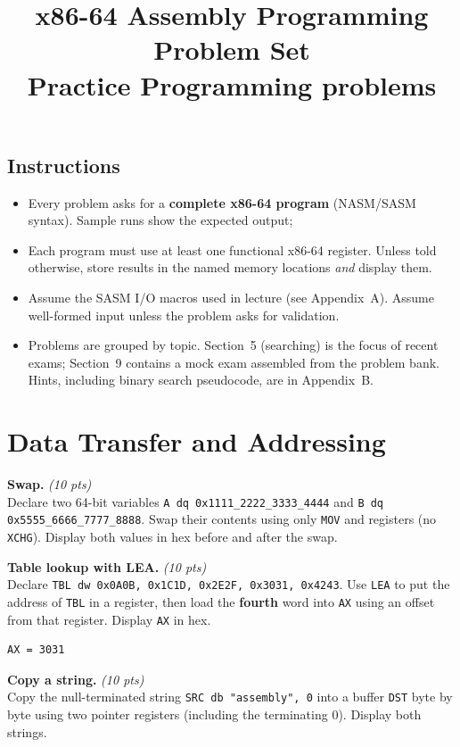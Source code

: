 \documentclass[11pt,letterpaper]{article}
\title{\textbf{x86-64 Assembly Programming Problem Set}\\[2pt]
\large Practice Programming problems}
\author{}
\date{}
\newcommand{\pts}[1]{\hfill\textit{(#1 pts)}}
\newcommand{\ttl}[1]{\textbf{#1.}}
\begin{document}
\maketitle
\thispagestyle{fancy}

\subsection*{Instructions}
\begin{itemize}[itemsep=2pt]
  \item Every problem asks for a \textbf{complete x86-64 program} (NASM/SASM syntax). Sample runs show the expected output;
  \item Each program must use at least one functional x86-64 register. Unless told otherwise, store results in the named memory locations \emph{and} display them.
  \item Assume the SASM I/O macros used in lecture (see Appendix~A). Assume well-formed input unless the problem asks for validation.
  \item Problems are grouped by topic. Section~5 (searching) is the focus of recent exams; Section~9 contains a mock exam assembled from the problem bank. Hints, including binary search pseudocode, are in Appendix~B.
\end{itemize}

\tableofcontents
\newpage

\section{Data Transfer and Addressing}

\begin{problems}

\item \ttl{Swap} \pts{10}
\\Declare two 64-bit variables \texttt{A dq 0x1111\_2222\_3333\_4444} and \texttt{B dq 0x5555\_6666\_7777\_8888}. Swap their contents using only \texttt{MOV} and registers (no \texttt{XCHG}). Display both values in hex before and after the swap.

\item \ttl{Table lookup with LEA} \pts{10}
\\Declare \texttt{TBL dw 0x0A0B, 0x1C1D, 0x2E2F, 0x3031, 0x4243}. Use \texttt{LEA} to put the address of \texttt{TBL} in a register, then load the \textbf{fourth} word into \texttt{AX} using an offset from that register. Display \texttt{AX} in hex.
\begin{lstlisting}[style=out]
AX = 3031
\end{lstlisting}

\item \ttl{Copy a string} \pts{10}
\\Copy the null-terminated string \texttt{SRC db "assembly", 0} into a buffer \texttt{DST} byte by byte using two pointer registers (including the terminating 0). Display both strings.

\end{problems}
\end{document}
